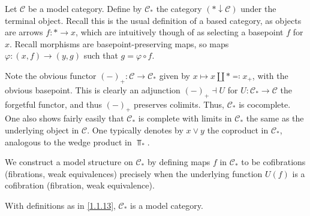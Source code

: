 \begin{construction}\label{1.1.13}
	Let $\mathcal{C} $ be a model category. Define by $\mathcal{C} _*$ the category $(*\downarrow \mathcal{C} )$ under the terminal object. Recall this is the usual definition of a based category, as objects are arrows $f : *\to x$, which are intuitively though of as selecting a basepoint $f$ for $x$. Recall morphisms are basepoint-preserving maps, so maps $\varphi : (x,f) \to (y,g)$ such that $g=\varphi \circ f$.

	Note the obvious functor $(-)_+ : \mathcal{C}  \to \mathcal{C} _*$ given by $x\mapsto x\amalg * \eqqcolon x_+$, with the obvious basepoint. This is clearly an adjunction $(-)_+ \dashv U$ for $U : \mathcal{C} _* \to \mathcal{C} $ the forgetful functor, and thus $(-)_+$ preserves colimits. Thus, $\mathcal{C} _*$ is cocomplete. One also shows fairly easily that $\mathcal{C} _*$ is complete with limits in $\mathcal{C} _*$ the same as the underlying object in $\mathcal{C} $. One typically denotes by $x\vee y$ the coproduct in $\mathcal{C} _*$, analogous to the wedge product in $\Top _*$.

	We construct a model structure on $\mathcal{C} _*$ by defining maps $f$ in $\mathcal{C} _*$ to be cofibrations (fibrations, weak equivalences) precisely when the underlying function $U(f)$ is a cofibration (fibration, weak equivalence).
\end{construction}
\begin{proposition}\label{1.1.14}
	With definitions as in \cref{1.1.13}, $\mathcal{C} _*$ is a model category.
\end{proposition}
